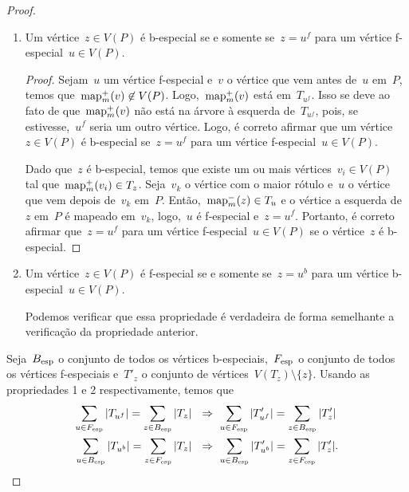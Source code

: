 \begin{proof}
\begin{enumerate}


		\item Um vértice~${z\in V(P)}$ é b-especial se e somente 
		se~${z=u^f}$ para um vértice
		f-especial~${u\in V(P)}$.
		\begin{proof}

		Sejam~$u$ um vértice f-especial 
		e~$v$ o vértice que vem antes 
		de~$u$ em~$P$, temos que~${\mathrm{map}^+_m(v)\not\in V(P)}$. 
		Logo,~$\mathrm{map}^+_m(v)$ está em~$T_{u^f}$.
		Isso se deve ao fato de que~$\mathrm{map}^+_m(v)$ não está na 
		árvore à esquerda
		de~$T_{u^f}$, pois, se estivesse,~$u^f$ seria um outro
		vértice.
		Logo, é correto afirmar que um vértice~${z\in V(P)}$ é b-especial
		se~${z=u^f}$ para um vértice f-especial~${u\in V(P)}$.

		Dado que~$z$ é b-especial,
		temos que existe um ou mais vértices~${v_i\in V(P)}$ tal
		que~${\mathrm{map}^+_m(v_i)\in T_{z}}$.
		Seja~$v_k$ o vértice com o maior rótulo e~$u$ o vértice 
		que vem depois de~$v_k$ em~$P$. 
		Então,~${\mathrm{map}^-_m(z)\in T_u}$ e o vértice a esquerda
		de~$z$ em~$P$ é
		mapeado em~$v_k$, logo,~$u$ é f-especial e~${z=u^f}$.
		Portanto, é correto afirmar que~${z=u^f}$ para um 
		vértice f-especial~${u\in V(P)}$ 
		se o vértice~$z$ é b-especial.
		\end{proof}

		\item Um vértice~${z\in V(P)}$ é f-especial se e somente 
		se~${z=u^b}$ para um vértice b-especial~${u\in V(P)}$. 

		Podemos verificar que essa propriedade é verdadeira de forma
		semelhante a verificação da propriedade anterior.
	\end{enumerate}

	Seja~$B_{\mathrm{esp}}$ 
	o conjunto de todos os vértices b-especiais,~$F_{\mathrm{esp}}$ o
	conjunto de todos os vértices f-especiais e~$T'_z$ o conjunto de 
	vértices~${V(T_z)\setminus \{z\}}$. 
	Usando as propriedades 
	1 e 2 respectivamente, temos que
	\begin{align}
		\displaystyle\sum_{u\in F_{\esp}}|T_{u^f}| = 
		\displaystyle\sum_{z\in B_{\esp}}|T_{z}| %
		\ \ &\Rightarrow \
		\displaystyle\sum_{u\in F_{\esp}}|T_{u^f}'| = 
		\displaystyle\sum_{z\in B_{\esp}}|T_{z}'| \label{eq:4}\\
		\displaystyle\sum_{u\in B_{\esp}}|T_{u^b}| = 
		\displaystyle\sum_{z\in F_{\esp}}|T_{z}| %
		\ \ &\Rightarrow \
		\displaystyle\sum_{u\in B_{\esp}}|T_{u^b}'| = 
		\displaystyle\sum_{z\in F_{\esp}}|T_{z}'| \label{eq:3}.
	\end{align}


\end{proof}
